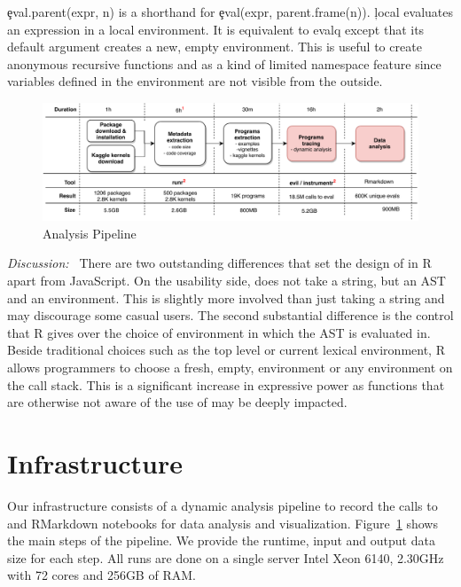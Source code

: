 \documentclass[conference]{IEEEtran}
\begin{document}
\c{eval.parent(expr, n)} is a shorthand for \c{eval(expr, parent.frame(n))}.
\c{local} evaluates an expression in a local environment. It is equivalent
to evalq except that its default argument creates a new, empty
environment. This is useful to create anonymous recursive functions and as a
kind of limited namespace feature since variables defined in the environment
are not visible from the outside.

\begin{figure}[!t]\centering\includegraphics[width=.8\linewidth]
{pipeline.pdf}\caption{Analysis Pipeline}\label{fig:pipeline}
\end{figure}

\medskip\emph{Discussion:~} There are two outstanding differences that set
the design of \eval in R apart from JavaScript. On the usability side, \eval
does not take a string, but an AST and an environment. This is slightly more
involved than just taking a string and may discourage some casual users.
The second substantial difference is the control that R gives over the
choice of environment in which the AST is evaluated in. Beside traditional
choices such as the top level or current lexical environment, R allows
programmers to choose a fresh, empty, environment or any environment on the
call stack. This is a significant increase in expressive power as functions
that are otherwise not aware of the use of \eval may be deeply impacted.

\section{Infrastructure}

Our infrastructure consists of a dynamic analysis pipeline to record the
calls to \eval and RMarkdown notebooks for data analysis and visualization.
Figure~\ref{fig:pipeline} shows the main steps of the pipeline. We provide
the runtime, input and output data size for each step. All runs are done on
a single server Intel Xeon 6140, 2.30GHz with 72 cores and 256GB of RAM.
\end{document}

